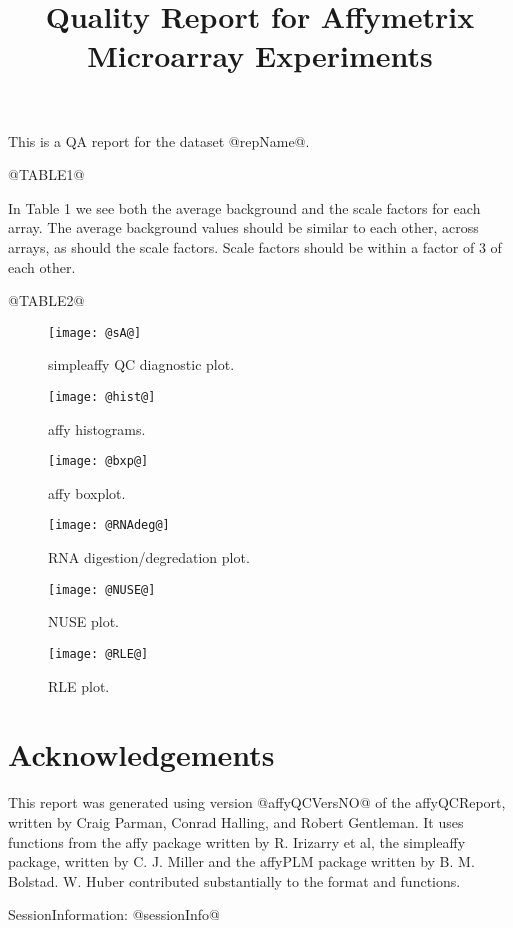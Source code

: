 \documentclass[11pt]{article}
\newcommand{\Rpackage}[1]{{\textsf{#1}}}
\begin{document}
\title{Quality Report for Affymetrix Microarray Experiments}

\maketitle

This is a QA report for the dataset @repName@.

@TABLE1@

In Table 1 we see both the average background and the scale factors for each
array.  The average background values should be similar to each other, 
across arrays, as should the scale factors. Scale factors should be within
a factor of 3 of each other.


@TABLE2@




\begin{figure}[tp]
  \centering
\texttt{[image: @sA@]}

\caption{\label{fig:sA}%
simpleaffy QC diagnostic plot.}
\end{figure}

\begin{figure}[tp]
  \centering
\texttt{[image: @hist@]}
\caption{\label{fig:hist}%
affy histograms.}
\end{figure}

\begin{figure}[tp]
  \centering
\texttt{[image: @bxp@]}
\caption{\label{fig:bxp}%
affy boxplot.}
\end{figure}


\begin{figure}[tp]
  \centering
\texttt{[image: @RNAdeg@]}
\caption{\label{fig:rnadeg}%
RNA digestion/degredation plot.}
\end{figure}

\begin{figure}[tp]
  \centering
\texttt{[image: @NUSE@]}
\caption{\label{fig:NUSE}%
NUSE plot.}
\end{figure}

\begin{figure}[tp]
  \centering
\texttt{[image: @RLE@]}
\caption{\label{fig:RLE}%
RLE plot.}
\end{figure}

\section{Acknowledgements}

This report was generated using version @affyQCVersNO@ of the 
\Rpackage{affyQCReport}, written by Craig Parman, Conrad Halling, and
Robert Gentleman. It uses functions from the \Rpackage{affy} package
written by R. Irizarry et al, the \Rpackage{simpleaffy} package, written
by C. J. Miller and the \Rpackage{affyPLM} package written by B. M. Bolstad.
W. Huber contributed substantially to the format and functions.

SessionInformation: 
@sessionInfo@
\end{document}
